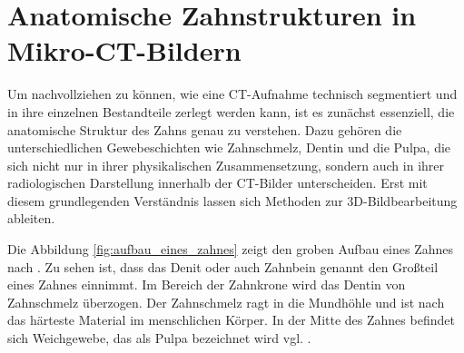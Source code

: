 \section{Anatomische Zahnstrukturen in Mikro-CT-Bildern}
\label{sec:domänenspezifisch} Um nachvollziehen zu können, wie eine \ac{CT}-Aufnahme
technisch segmentiert und in ihre einzelnen Bestandteile zerlegt werden kann,
ist es zunächst essenziell, die anatomische Struktur des Zahns genau zu verstehen.
Dazu gehören die unterschiedlichen Gewebeschichten wie Zahnschmelz, Dentin und die
Pulpa, die sich nicht nur in ihrer physikalischen Zusammensetzung, sondern auch in
ihrer radiologischen Darstellung innerhalb der \ac{CT}-Bilder unterscheiden. Erst
mit diesem grundlegenden Verständnis lassen sich Methoden zur 3D-Bildbearbeitung
ableiten.

\begin{minipage}{0.40\textwidth}
	Die Abbildung \ref{fig:aufbau_eines_zahnes} zeigt den groben Aufbau eines Zahnes
	nach \citet[S.~17]{lehmann2012Zahnheilkunde}. Zu sehen ist, dass das Denit
	oder auch Zahnbein genannt den Großteil eines Zahnes einnimmt. Im Bereich der Zahnkrone
	wird das Dentin von Zahnschmelz überzogen. Der Zahnschmelz ragt in die
	Mundhöhle und ist nach \citet[S.~41]{lehmann2012Zahnheilkunde} das härteste Material
	im menschlichen Körper. In der Mitte des Zahnes befindet sich Weichgewebe, das
	als Pulpa bezeichnet wird vgl. \citep[vgl.][S.~15]{lehmann2012Zahnheilkunde}.
\end{minipage}
\hfill
